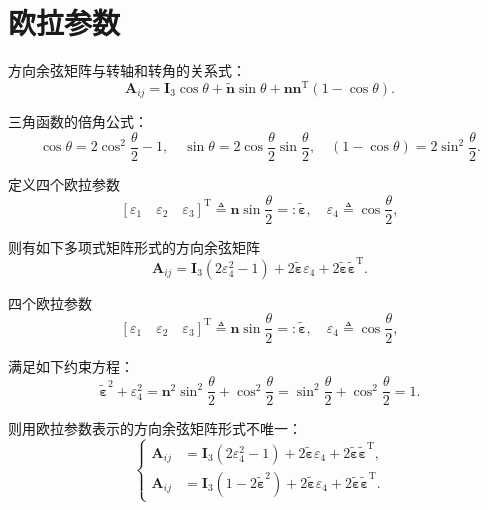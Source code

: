 \section{欧拉参数}\label{sec:euler-parameters}

方向余弦矩阵与转轴和转角的关系式：
\begin{equation}
    \bm{A}_{ij} = \bm{I}_3\cos\theta + \tilde{\bm{n}}\sin\theta + \bm{n}\bm{n}^{\mathrm{T}}(1-\cos\theta).
\end{equation}

三角函数的倍角公式：
\begin{equation}
    \cos\theta = 2\cos^2\frac{\theta}{2}-1,\quad \sin\theta = 2\cos\frac{\theta}{2}\sin\frac{\theta}{2},\quad (1-\cos\theta) = 2\sin^2\frac{\theta}{2}.
\end{equation}

定义四个欧拉参数
\begin{equation}
    \left[\varepsilon_1\quad \varepsilon_2\quad \varepsilon_3\right]^{\mathrm{T}} \triangleq \bm{n}\sin\frac{\theta}{2} =: \tilde{\bm{\varepsilon}},\quad \varepsilon_4 \triangleq \cos\frac{\theta}{2},
\end{equation}

则有如下多项式矩阵形式的方向余弦矩阵
\begin{equation}
    \bm{A}_{ij} = \bm{I}_3(2\varepsilon_4^2 - 1) + 2\tilde{\bm{\varepsilon}}\varepsilon_4 + 2\tilde{\bm{\varepsilon}}\tilde{\bm{\varepsilon}}^{\mathrm{T}}.
\end{equation}

四个欧拉参数
\begin{equation}
    \left[\varepsilon_1\quad \varepsilon_2\quad \varepsilon_3\right]^{\mathrm{T}} \triangleq \bm{n}\sin\frac{\theta}{2} =: \tilde{\bm{\varepsilon}},\quad \varepsilon_4 \triangleq \cos\frac{\theta}{2},
\end{equation}

满足如下约束方程：
\begin{equation}
    \tilde{\bm{\varepsilon}}^2 + \varepsilon_4^2 = \bm{n}^2\sin^2\frac{\theta}{2} + \cos^2\frac{\theta}{2} = \sin^2\frac{\theta}{2} + \cos^2\frac{\theta}{2} = 1.
\end{equation}

则用欧拉参数表示的方向余弦矩阵形式不唯一：
\begin{equation}
    \left\{\begin{aligned}
        \bm{A}_{ij} &= \bm{I}_3(2\varepsilon_4^2 - 1) + 2\tilde{\bm{\varepsilon}}\varepsilon_4 + 2\tilde{\bm{\varepsilon}}\tilde{\bm{\varepsilon}}^{\mathrm{T}},\\
        \bm{A}_{ij} &= \bm{I}_3(1 - 2\tilde{\bm{\varepsilon}}^2) + 2\tilde{\bm{\varepsilon}}\varepsilon_4 + 2\tilde{\bm{\varepsilon}}\tilde{\bm{\varepsilon}}^{\mathrm{T}}.
    \end{aligned}\right.
\end{equation}

